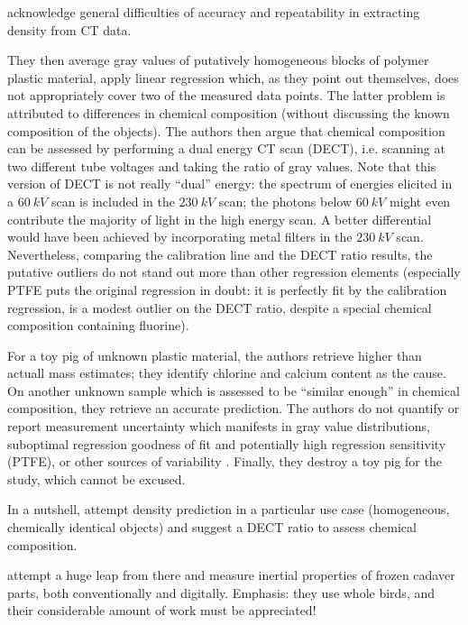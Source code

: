 \citet{DuPlessis2013} acknowledge general difficulties of accuracy and repeatability in extracting density from CT data.

They then average gray values of putatively homogeneous blocks of polymer plastic material, apply linear regression which, as they point out themselves, does not appropriately cover two of the measured data points.
The latter problem is attributed to differences in chemical composition (without discussing the known composition of the objects).
The authors then argue that chemical composition can be assessed by performing a dual energy CT scan (DECT), i.e. scanning at two different tube voltages and taking the ratio of gray values.
Note that this version of DECT is not really ``dual'' energy: the spectrum of energies elicited in a \(60\ kV\) scan is included in the \(230\ kV\) scan; the photons below \(60\ kV\) might even contribute the majority of light in the high energy scan.
A better differential would have been achieved by incorporating metal filters in the \(230\ kV\) scan.
Nevertheless, comparing the calibration line and the DECT ratio results, the putative outliers do not stand out more than other regression elements (especially PTFE puts the original regression in doubt: it is perfectly fit by the calibration regression, is a modest outlier on the DECT ratio, despite a special chemical composition containing fluorine).

For a toy pig of unknown plastic material, the authors retrieve higher than actuall mass estimates; they identify chlorine and calcium content as the cause.
On another unknown sample which is assessed to be ``similar enough'' in chemical composition, they retrieve an accurate prediction.
The authors do not quantify or report measurement uncertainty which manifests in gray value distributions, suboptimal regression goodness of fit and potentially high regression sensitivity (PTFE), or other sources of variability \citep{Macaulay2017}.
Finally, they destroy a toy pig for the study, which cannot be excused.

In a nutshell, \citet{DuPlessis2013} attempt density prediction in a particular use case (homogeneous, chemically identical objects) and suggest a DECT ratio to assess chemical composition.


\citet{Durston2022} attempt a huge leap from there and measure inertial properties of frozen cadaver parts, both conventionally and digitally.
Emphasis: they use whole birds, and their considerable amount of work must be appreciated!

